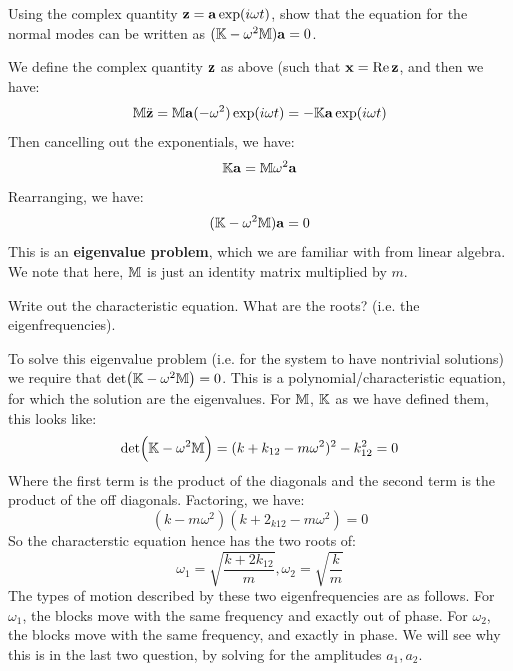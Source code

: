 \begin{p}
Using the complex quantity $\mathbf{z} = \mathbf{a}\exp(i\omega t)$, show that the equation for the normal modes can be written as $(\mathbb{K} - \omega^2\mathbb{M})\mathbf{a} = 0$.
\end{p}
\begin{s}
We define the complex quantity $\mathbf{z}$ as above (such that $\mathbf{x} = \Re\mathbf{z}$, and then we have:
\[\mathbb{M}\ddot{\mathbf{z}} = \mathbb{M}\mathbf{a}(-\omega^2)\exp(i\omega t) = -\mathbb{K}\mathbf{a}\exp(i\omega t)\]
Then cancelling out the exponentials, we have:
\[\mathbb{K}\mathbf{a} = \mathbb{M}\omega^2\mathbf{a}\]
Rearranging, we have:
\[(\mathbb{K} - \omega^2\mathbb{M})\mathbf{a} = 0\]
This is an \textbf{eigenvalue problem}, which we are familiar with from linear algebra. We note that here, $\mathbb{M}$ is just an identity matrix multiplied by $m$.
\end{s}

\begin{p}
Write out the characteristic equation. What are the roots? (i.e. the eigenfrequencies).
\end{p}
\begin{s}
To solve this eigenvalue problem (i.e. for the system to have nontrivial solutions) we require that $\det(\mathbb{K} - \omega^2\mathbb{M}) = 0$. This is a polynomial/characteristic equation, for which the solution are the eigenvalues. For $\mathbb{M}$, $\mathbb{K}$ as we have defined them, this looks like:
\[\det(\mathbb{K} - \omega^2\mathbb{M}) = (k + k_{12}- m\omega^2)^2 - k_{12}^2 = 0\]
Where the first term is the product of the diagonals and the second term is the product of the off diagonals. Factoring, we have:
\[(k - m\omega^2)(k + 2_{k12} - m\omega^2) = 0\]
So the characterstic equation hence has the two roots of:
\[\omega_1 = \sqrt{\frac{k + 2k_{12}}{m}}, \omega_2 = \sqrt{\frac{k}{m}}\]
The types of motion described by these two eigenfrequencies are as follows. For $\omega_1$, the blocks move with the same frequency and exactly out of phase. For $\omega_2$, the blocks move with the same frequency, and exactly in phase. We will see why this is in the last two question, by solving for the amplitudes $a_1, a_2$.
\end{s}


